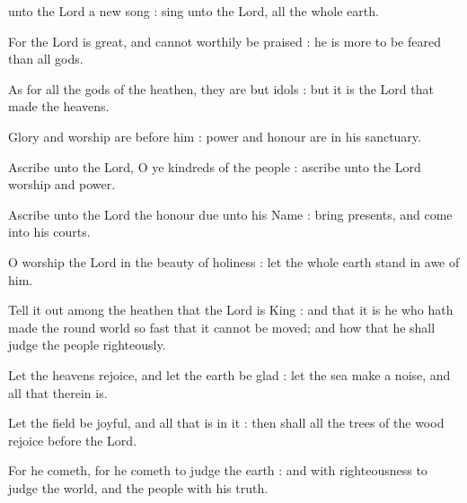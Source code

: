  unto the Lord a new song : sing unto the Lord, all the whole earth.\par
{}
For the Lord is great, and cannot worthily be praised : he is more to be feared than all gods.\par
{}As for all the gods of the heathen, they are but idols : but it is the Lord that made the heavens.\par
{}Glory and worship are before him : power and honour are in his sanctuary.\par
{}Ascribe unto the Lord, O ye kindreds of the people : ascribe unto the Lord worship and power.\par
{}Ascribe unto the Lord the honour due unto his Name : bring presents, and come into his courts.\par
{}O worship the Lord in the beauty of holiness : let the whole earth stand in awe of him.\par
{}Tell it out among the heathen that the Lord is King : and that it is he who hath made the round world so fast that it cannot be moved; and how that he shall judge the people righteously.\par
{}Let the heavens rejoice, and let the earth be glad : let the sea make a noise, and all that therein is.\par
{}Let the field be joyful, and all that is in it : then shall all the trees of the wood rejoice before the Lord.\par
{}For he cometh, for he cometh to judge the earth : and with righteousness to judge the world, and the people with his truth.\par



